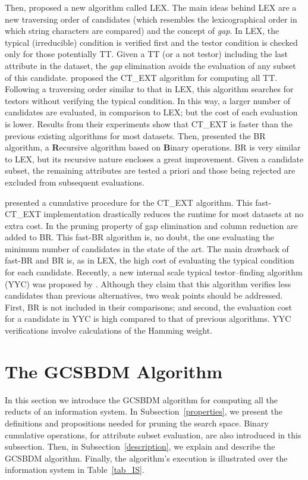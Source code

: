\documentclass[authoryear,preprint,review,12pt]{elsarticle}
\begin{document}
  Then, \cite{Santiesteban03} proposed a new algorithm called LEX. The main ideas behind LEX are a new traversing
  order of candidates (which resembles the lexicographical order in which string characters are compared) and the
  concept of \emph{gap}. In LEX, the typical (irreducible) condition is verified first and the testor condition 
  is checked only for those potentially TT. Given a TT (or a not testor) including the last attribute in the
  dataset, the \emph{gap} elimination avoids the evaluation of any subset of this candidate. \cite{Sanchez07}
  proposed the CT\_EXT algorithm for computing all TT. Following a traversing order similar to that in LEX, this
  algorithm searches for testors without verifying the typical condition. In this way, a larger number of 
  candidates are evaluated, in comparison to LEX; but the cost of each evaluation is lower. Results from their
  experiments show that CT\_EXT is faster than the previous existing algorithms for most datasets. Then,
  \cite{Lias09} presented the BR algorithm, a \textbf{R}ecursive algorithm based on \textbf{B}inary operations. 
  BR is very similar to LEX, but its recursive nature encloses a great improvement. Given a candidate subset, the 
  remaining attributes are tested a priori and those being rejected are excluded from subsequent evaluations. 
  
  \cite{Sanchez10} presented a cumulative procedure for the CT\_EXT algorithm. This fast-CT\_EXT implementation
  drastically reduces the runtime for most datasets at no extra cost. In \citep{Lias13} the pruning property of
  gap elimination and column reduction are added to BR. This fast-BR algorithm is, no doubt, the one 
  evaluating the minimum number of candidates in the state of the art. The main drawback of fast-BR and 
  BR is, as in LEX, the high cost of evaluating the typical condition for each candidate.
  Recently, a new internal scale typical testor--finding algorithm (YYC) was proposed by \cite{Alba14}. 
  Although they claim that this algorithm verifies less candidates than previous alternatives, two weak points
  should be addressed. First, BR is not included in their comparisons; and second, the evaluation cost for a
  candidate in YYC is high compared to that of previous algorithms. YYC verifications involve calculations of the 
  Hamming weight.

\section{The GCSBDM Algorithm}\label{GCSBDM}
  In this section we introduce the GCSBDM algorithm for computing all the reducts of an information system. In  Subsection~\ref{properties}, we present the definitions and propositions needed for pruning the search space.  Binary cumulative operations, for attribute subset evaluation, are also introduced in this subsection. Then, in Subsection~\ref{description}, we explain and describe the GCSBDM algorithm. Finally, the algorithm's execution is illustrated over the information system in Table~\ref{tab_IS}.
  
\end{document}
